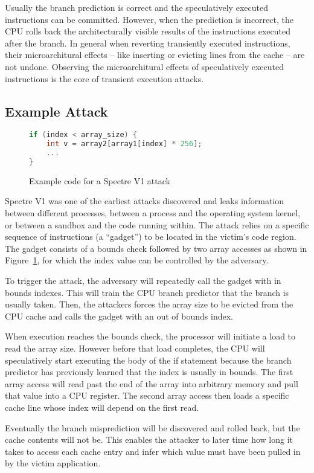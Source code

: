 Usually the branch prediction is correct and the speculatively executed instructions can be committed.
However, when the prediction is incorrect, the CPU rolls back the architecturally visible results of the instructions executed after the branch.
In general when reverting transiently executed instructions, their microarchitural effects -- like inserting or evicting lines from the cache -- are not undone.
Observing the  microarchitural effects of speculatively executed instructions is the core of transient execution attacks.

\subsection{Example Attack}
\begin{figure}[h]
\begin{lstlisting}[language=C, style=codeStyle]
if (index < array_size) {
    int v = array2[array1[index] * 256];
    ...
}
\end{lstlisting}
\caption{Example code for a Spectre V1 attack}
\label{fig:spectre-code}
\end{figure}
Spectre V1 was one of the earliest attacks discovered and leaks information between different processes, between a process and the operating system kernel, or between a sandbox and the code running within.
The attack relies on a specific sequence of instructions (a ``gadget'') to be located in the victim's code region.
The gadget consists of a bounds check followed by two array accesses as shown in Figure~\ref{fig:spectre-code}, for which the index value can be controlled by the adversary.

To trigger the attack, the adversary will repeatedly call the gadget with in bounds indexes.
This will train the CPU branch predictor that the branch is usually taken.
Then, the attackers forces the array size to be evicted from the CPU cache and calls the gadget with an out of bounds index.

When execution reaches the bounds check, the processor will initiate a load to read the array size.
However before that load completes, the CPU will speculatively start executing the body of the if statement because the branch predictor has previously learned that the index is usually in bounds.
The first array access will read past the end of the array into arbitrary memory and pull that value into a CPU register.
The second array access then loads a specific cache line whose index will depend on the first read.

Eventually the branch misprediction will be discovered and rolled back, but the cache contents will not be.
This enables the attacker to later time how long it takes to access each cache entry and infer which value must have been pulled in by the victim application.

